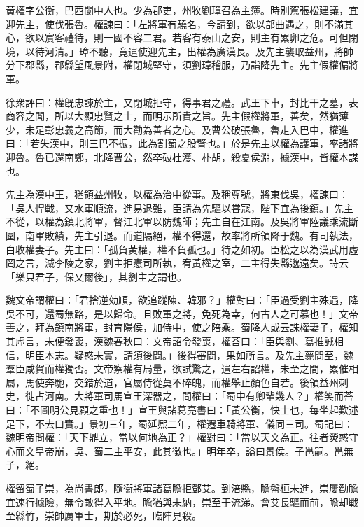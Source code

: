 
\begin{pinyinscope}
黃權字公衡，巴西閬中人也。少為郡吏，州牧劉璋召為主簿。時別駕張松建議，宜迎先主，使伐張魯。權諫曰：「左將軍有驍名，今請到，欲以部曲遇之，則不滿其心，欲以賔客禮待，則一國不容二君。若客有泰山之安，則主有累卵之危。可但閉境，以待河清。」璋不聽，竟遣使迎先主，出權為廣漢長。及先主襲取益州，將帥分下郡縣，郡縣望風景附，權閉城堅守，須劉璋稽服，乃詣降先主。先主假權偏將軍。

徐衆評曰：權旣忠諫於主，又閉城拒守，得事君之禮。武王下車，封比干之墓，表商容之閭，所以大顯忠賢之士，而明示所貴之旨。先主假權將軍，善矣，然猶薄少，未足彰忠義之高節，而大勸為善者之心。及曹公破張魯，魯走入巴中，權進曰：「若失漢中，則三巴不振，此為割蜀之股臂也。」於是先主以權為護軍，率諸將迎魯。魯已還南鄭，北降曹公，然卒破杜濩、朴胡，殺夏侯淵，據漢中，皆權本謀也。

先主為漢中王，猶領益州牧，以權為治中從事。及稱尊號，將東伐吳，權諫曰：「吳人悍戰，又水軍順流，進易退難，臣請為先驅以甞寇，陛下宜為後鎮。」先主不從，以權為鎮北將軍，督江北軍以防魏師；先主自在江南。及吳將軍陸議乘流斷圍，南軍敗績，先主引退。而道隔絕，權不得還，故率將所領降于魏。有司執法，白收權妻子。先主曰：「孤負黃權，權不負孤也。」待之如初。臣松之以為漢武用虛罔之言，滅李陵之家，劉主拒憲司所執，宥黃權之室，二主得失縣邈遠矣。詩云「樂只君子，保乂爾後」，其劉主之謂也。

魏文帝謂權曰：「君捨逆効順，欲追蹤陳、韓邪？」權對曰：「臣過受劉主殊遇，降吳不可，還蜀無路，是以歸命。且敗軍之將，免死為幸，何古人之可慕也！」文帝善之，拜為鎮南將軍，封育陽侯，加侍中，使之陪乘。蜀降人或云誅權妻子，權知其虛言，未便發喪，漢魏春秋曰：文帝詔令發喪，權荅曰：「臣與劉、葛推誠相信，明臣本志。疑惑未實，請須後問。」後得審問，果如所言。及先主薨問至，魏羣臣咸賀而權獨否。文帝察權有局量，欲試驚之，遣左右詔權，未至之間，累催相屬，馬使奔馳，交錯於道，官屬侍從莫不碎魄，而權舉止顏色自若。後領益州刺史，徙占河南。大將軍司馬宣王深器之，問權曰：「蜀中有卿輩幾人？」權笑而荅曰：「不圖明公見顧之重也！」宣王與諸葛亮書曰：「黃公衡，快士也，每坐起歎述足下，不去口實。」景初三年，蜀延熈二年，權遷車騎將軍、儀同三司。蜀記曰：魏明帝問權：「天下鼎立，當以何地為正？」權對曰：「當以天文為正。往者熒惑守心而文皇帝崩，吳、蜀二主平安，此其徵也。」明年卒，謚曰景侯。子邕嗣。邕無子，絕。

權留蜀子崇，為尚書郎，隨衞將軍諸葛瞻拒鄧艾。到涪縣，瞻盤桓未進，崇屢勸瞻宜速行據險，無令敵得入平地。瞻猶與未納，崇至于流涕。會艾長驅而前，瞻却戰至緜竹，崇帥厲軍士，期於必死，臨陣見殺。


\end{pinyinscope}
